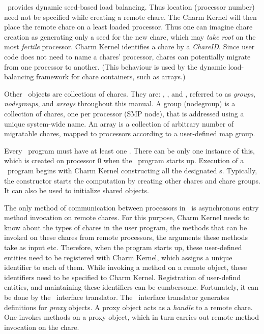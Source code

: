 \charmpp\ provides dynamic seed-based load balancing. Thus location (processor
number) need not be specified while creating a remote chare. The
Charm Kernel will then place the remote chare on a least loaded processor. Thus
one can imagine chare creation as generating only a seed for the new chare,
which may {\em take root} on the most {\em fertile} processor. Charm Kernel
identifies a chare by a {\em ChareID}.  Since user code does not
need to name a chares' processor, chares can potentially migrate from one
processor to another.  (This behaviour is used by the dynamic load-balancing
framework for chare containers, such as arrays.)

Other \charmpp\ objects are collections of chares. They are: , , and , referred to as {\em groups}, {\em nodegroups}, and {\em arrays}
throughout this manual. A group (nodegroup) is a collection of chares, one per
processor (SMP node), that is addressed using a unique system-wide name. An
array is a collection of arbitrary number of migratable chares, mapped to
processors according to a user-defined map group.

Every \charmpp\ program must have at least one .  There can be
only one instance of this, which is created on processor 0 when
the \charmpp\ program starts up.  Execution of a \charmpp\ program begins with
Charm Kernel constructing all the designated s.  Typically, the
 constructor starts the computation by creating other chares and
chare  groups.  It can also be used to initialize shared
 objects.

The only method of communication between processors in \charmpp\ is
asynchronous  entry method invocation on remote chares. For
this purpose, Charm Kernel needs to know about the types of chares
in the user program, the methods that can be invoked on these chares from
remote processors, the arguments these methods take as input etc. Therefore,
when the program starts up, these user-defined entities need to be registered
with Charm Kernel, which assigns a unique identifier to each of them. While
invoking a method on a remote object, these identifiers need to be specified to
Charm Kernel. Registration of user-defind entities, and maintaining these
identifiers can be cumbersome. Fortunately, it can be done by the \charmpp\
interface translator. The \charmpp\ interface translator generates definitions
for {\em proxy} objects. A proxy object acts as a {\em handle} to a remote
chare. One invokes methods on a proxy object, which in turn carries out remote
method invocation on the chare.

